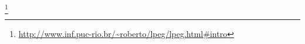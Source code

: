 \footnote{\protect\url{http://www.inf.puc-rio.br/~roberto/lpeg/lpeg.html\#intro}}

\endinput

local alpha, cntrl, digit, graph, lower, punct, space, upper, alnum, xdigit =
   lpeg.alpha, lpeg.cntrl, lpeg.digit, lpeg.graph, lpeg.lower, lpeg.punct,
   lpeg.space, lpeg.upper, lpeg.alnum, lpeg.xdigit

local pattern = lpeg.Ct(lpeg.upper)   
local upwords = lpeg.match(pattern "Some words") 

http://leafo.net/guides/parsing-expression-grammars.html#what-is-a-peg
